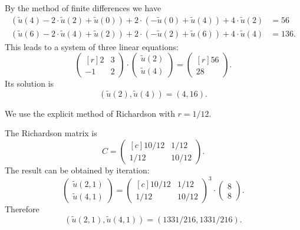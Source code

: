 \begin{loesung}
\begin{teilaufgaben}
\item
By the method of finite differences we have
\begin{align*}
(\tilde u(4) - 2 \cdot \tilde u(2) + \tilde u(0))
+ 2 \cdot (- \tilde u(0) + \tilde u(4))
+ 4 \cdot \tilde u(2)
&=
56
\\
(\tilde u(6) - 2 \cdot \tilde u(4) + \tilde u(2))
+ 2 \cdot (- \tilde u(2) + \tilde u(6)) + 4 \cdot \tilde u(4)
&=
136.
\end{align*}
This leads to a system of three linear equations:
\begin{equation}
\begin{pmatrix*}[r] 2 & 3 \\  -1 & 2 \end{pmatrix*}
\cdot
\begin{pmatrix} \tilde u(2)  \\   \tilde u(4)  \end{pmatrix}
=
\begin{pmatrix*}[r] 56  \\  28 \end{pmatrix*}.
\tag{2P}
\end{equation}
Its solution is
\begin{equation}
(\tilde u(2),  \tilde u(4)) = (4 , 16).
\tag{1P}
\end{equation}



\item
We use the explicit method of Richardson with $r = 1/12$. 

\smallskip

The Richardson matrix is
\begin{equation}
C
=
\begin{pmatrix*}[c] 10/12 & 1/12 \\  1/12 & 10/12 \end{pmatrix*}.
\tag{1P}
\end{equation}
The result can be obtained by iteration:
\begin{equation}
\begin{pmatrix} \tilde u(2,1)  \\ \tilde u(4,1)  \end{pmatrix}
=
\begin{pmatrix*}[c] 10/12 & 1/12 \\  1/12 & 10/12 \end{pmatrix*}^3
\cdot
\begin{pmatrix} 8  \\ 8  \end{pmatrix}.
\tag{1P}
\end{equation}
Therefore
\begin{equation}
(\tilde u(2,1), \tilde u(4,1))
=
(1331/216, 1331/216).
\tag{1P}
\end{equation}

\end{teilaufgaben}
\end{loesung}
